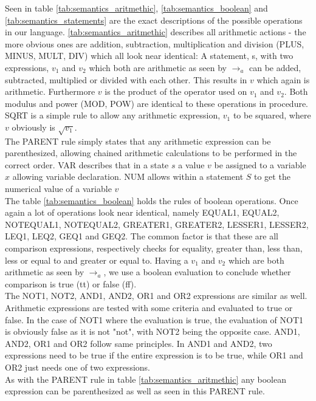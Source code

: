 Seen in table \ref{tab:semantics_aritmethic}, \ref{tab:semantics_boolean} and \ref{tab:semantics_statements} are the exact descriptions of the possible operations in our language. \ref{tab:semantics_aritmethic} describes all arithmetic actions - the more obvious ones are addition, subtraction, multiplication and division (PLUS, MINUS, MULT, DIV) which all look near identical: A statement, s, with two expressions, $v_{1}$ and $v_{2}$ which both are arithmetic as seen by $\rightarrow_{a}$ can be added, subtracted, multiplied or divided with each other. This results in $v$ which again is arithmetic. Furthermore $v$ is the product of the operator used on $v_{1}$ and $v_{2}$. Both modulus and power (MOD, POW) are identical to these operations in procedure. \\
SQRT is a simple rule to allow any arithmetic expression, $v_{1}$ to be squared, where $v$ obviously is $\sqrt{v_{1}}$. \\
The PARENT rule simply states that any arithmetic expression can be parenthesized, allowing chained arithmetic calculations to be performed in the correct order. VAR describes that in a state $s$ a value $v$ be assigned to a variable $x$ allowing variable declaration. NUM allows within a statement $S$ to get the numerical value of a variable $v$ \\

The table \ref{tab:semantics_boolean} holds the rules of boolean operations. Once again a lot of operations look near identical, namely EQUAL1, EQUAL2, NOTEQUAL1, NOTEQUAL2, GREATER1, GREATER2, LESSER1, LESSER2, LEQ1, LEQ2, GEQ1 and GEQ2. The common factor is that these are all comparison expressions, respectively checks for equality, greater than, less than, less or equal to and greater or equal to. Having a $v_{1}$ and $v_{2}$ which are both arithmetic as seen by $\rightarrow_{a}$, we use a boolean evaluation to conclude whether comparison is true (tt) or false (ff). \\
The NOT1, NOT2, AND1, AND2, OR1 and OR2 expressions are similar as well. Arithmetic expressions are tested with some criteria and evaluated to true or false. In the case of NOT1 where the evaluation is true, the evaluation of NOT1 is obviously false as it is not "not", with NOT2 being the opposite case. AND1, AND2, OR1 and OR2 follow same principles. In AND1 and AND2, two expressions need to be true if the entire expression is to be true, while OR1 and OR2 just needs one of two expressions. \\
As with the PARENT rule in table \ref{tab:semantics_aritmethic} any boolean expression can be parenthesized as well as seen in this PARENT rule. \\

